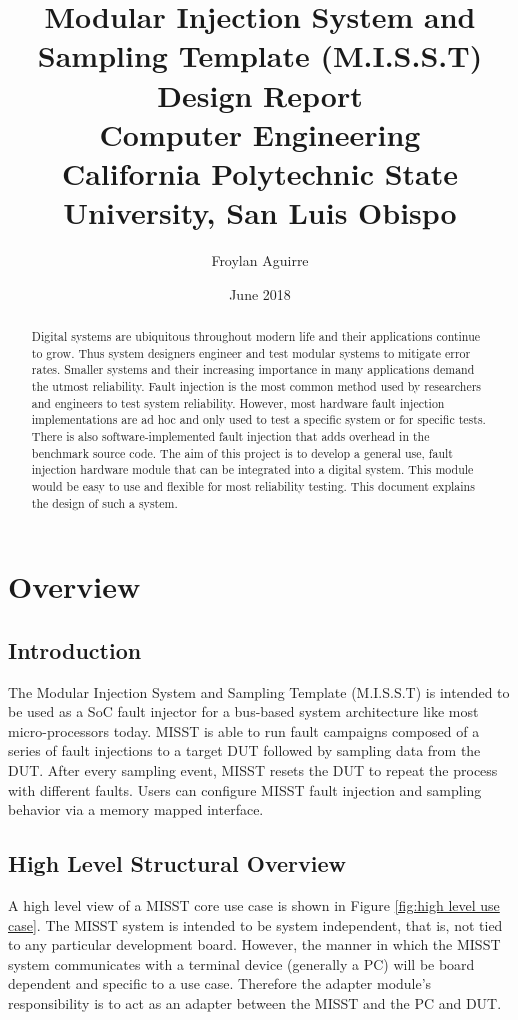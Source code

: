 \documentclass[]{report}
\title{
	{Modular Injection System and Sampling Template (M.I.S.S.T) Design Report}\\
	{\large Computer Engineering}\\
	{\large California Polytechnic State University, San Luis Obispo}\\
}
\author{Froylan Aguirre}
\date{June 2018}
\begin{document}
\maketitle

\begin{abstract}
	Digital systems are ubiquitous throughout modern life and their applications continue to grow. Thus system designers engineer and test modular systems to mitigate error rates. Smaller systems and their increasing importance in many applications demand the utmost reliability. Fault injection is the most common method used by researchers and engineers to test system reliability. However, most hardware fault injection implementations are ad hoc and only used to test a specific system or for specific tests. There is also software-implemented fault injection that adds overhead in the benchmark source code. The aim of this project is to develop a general use, fault injection hardware module that can be integrated into a digital system. This module would be easy to use and flexible for most reliability testing. This document explains the design of such a system.
\end{abstract}

\chapter{Overview}

\section{Introduction}
The Modular Injection System and Sampling Template (M.I.S.S.T) is intended to be used as a SoC fault injector for a bus-based system architecture like most micro-processors today. MISST is able to run fault campaigns composed of a series of fault injections to a target DUT followed by sampling data from the DUT. After every sampling event, MISST resets the DUT to repeat the process with different faults. Users can configure MISST fault injection and sampling behavior via a memory mapped interface.  

\section{High Level Structural Overview}
A high level view of a MISST core use case is shown in Figure \ref{fig:high level use case}. The MISST system is intended to be system independent, that is, not tied to any particular development board. However, the manner in which the MISST system communicates with a terminal device (generally a PC) will be board dependent and specific to a use case. Therefore the adapter module's responsibility is to act as an adapter between the MISST and the PC and DUT.
\end{document}
